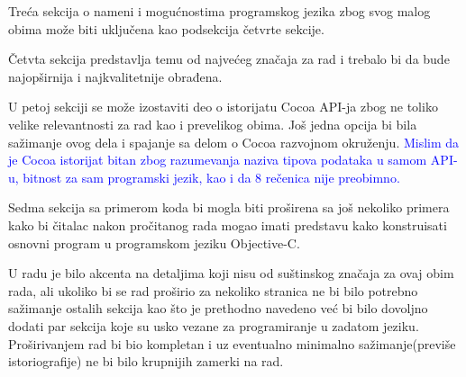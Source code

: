 \documentclass[a4paper]{report}
\newcommand{\odgovor}[1]{\textcolor{blue}{#1}}
\begin{document}
Treća sekcija o nameni i mogućnostima programskog jezika zbog svog malog obima može biti uključena kao podsekcija četvrte sekcije.

Četvta sekcija predstavlja temu od najvećeg značaja za rad i trebalo bi da bude najopširnija i najkvalitetnije obrađena.

U petoj sekciji se može izostaviti deo o istorijatu Cocoa API-ja zbog ne toliko velike relevantnosti za rad kao i prevelikog obima. Još jedna opcija bi bila sažimanje ovog dela i spajanje sa delom o Cocoa razvojnom okruženju. \odgovor{Mislim da je Cocoa istorijat bitan zbog razumevanja naziva tipova podataka u samom API-u, bitnost za sam programski jezik, kao i da 8 rečenica nije preobimno.}

Sedma sekcija sa primerom koda bi mogla biti proširena sa još nekoliko primera kako bi čitalac nakon pročitanog rada mogao imati predstavu kako konstruisati osnovni program u programskom jeziku Objective-C.

U radu je bilo akcenta na detaljima koji nisu od suštinskog značaja za ovaj obim rada, ali ukoliko bi se rad proširio za nekoliko stranica ne bi bilo potrebno sažimanje ostalih sekcija kao što je prethodno navedeno već bi bilo dovoljno dodati par sekcija koje su usko vezane za programiranje u zadatom jeziku. Proširivanjem rad bi bio kompletan i uz eventualno minimalno sažimanje(previše istoriografije) ne bi bilo krupnijih zamerki na rad.
\end{document}
